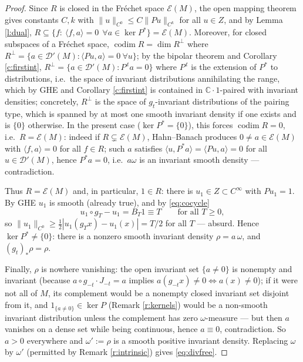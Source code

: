 \documentclass[11pt]{amsart}
\theoremstyle{plain}
\theoremstyle{definition}
\theoremstyle{remark}
\newcommand{\DD}{\mathcal{D}'}
\newcommand{\EE}{\mathcal{E}}
\newcommand{\flow}{g_t}
\newcommand{\codim}{\operatorname{codim}}
\begin{document}
\begin{proof}
Since $R$ is closed in the Fr\'echet space $\EE(M)$, the open mapping
theorem \cite[IV, Th.~17.1]{HorLA} gives constants $C,k$ with
$\|u\|_{C^0}\le C\|Pu\|_{C^{k}}$ for all $u\in Z$, and by
Lemma \ref{l:dual}, $R\subseteq \{f:\ \langle f,a\rangle=0\ \
\forall a\in\ker P^*\}=\EE(M)$.  Moreover, for closed subspaces of a
Fr\'echet space, $\codim R=\dim R^\perp$ where $R^\perp=\{a\in
\DD(M): \langle Pu,a\rangle=0\ \forall u\}$; by the bipolar
theorem and Corollary \ref{c:firstint},
$R^\perp=\{a\in\DD(M): P^{\,t}a=0\}$ where $P^{\,t}$ is the
extension of $P^*$ to distributions, i.e.\ the space of invariant
distributions annihilating the range, which by GHE and Corollary
\ref{c:firstint} is contained in $\mathbb{C}\cdot1$-paired with
invariant densities; concretely, $R^\perp$ is the space of
$\flow$-invariant distributions of the pairing type, which is
spanned by at most one smooth invariant density if one exists and is
$\{0\}$ otherwise.  In the present case ($\ker P^*=\{0\}$), this
forces $\codim R=0$, i.e.\ $R=\EE(M)$: indeed if $R\subsetneq\EE(M)$,
Hahn--Banach produces $0\ne a\in\EE(M)$ with $\langle f,a\rangle=0$
for all $f\in R$; such $a$ satisfies
$\langle u,P^*a\rangle=\langle Pu,a\rangle=0$ for all $u\in\DD(M)$,
hence $P^*a=0$, i.e.\ $a\omega$ is an invariant smooth density ---
contradiction.

Thus $R=\EE(M)$ and, in particular, $1\in R$: there is
$u_1\in Z\subset C^\infty$ with $Pu_1=1$.  By GHE $u_1$ is smooth
(already true), and by \eqref{eq:cocycle}
\[
u_1\circ g_T-u_1=B_T1\equiv T\qquad\text{for all }T\ge0,
\]
so $\|u_1\|_{C^0}\ge \tfrac12|u_1(g_Tx)-u_1(x)|=T/2$ for all $T$ ---
absurd.  Hence $\ker P^*\ne\{0\}$: there is a nonzero smooth invariant
density $\rho=a\,\omega$, and $(g_t)_*\rho=\rho$.

Finally, $\rho$ is nowhere vanishing: the open invariant set
$\{a\ne0\}$ is nonempty and invariant (because
$a\circ g_{-t}\cdot J_{-t}=a$ implies $a(g_{-t}x)\ne0\iff a(x)\ne
0$); if it were not all of $M$, its complement would be a nonempty
closed invariant set disjoint from it, and
$1_{\{a\ne0\}}\in\ker P$ (Remark \ref{r:kernels}) would be a
non-smooth invariant distribution unless the complement has zero
$\omega$-measure --- but then $a$ vanishes on a dense set while
being continuous, hence $a\equiv0$, contradiction.  So $a>0$
everywhere and $\omega':=\rho$ is a smooth positive invariant
density.  Replacing $\omega$ by $\omega'$ (permitted by Remark
\ref{r:intrinsic}) gives \eqref{eq:divfree}.
\end{proof}
\end{document}

